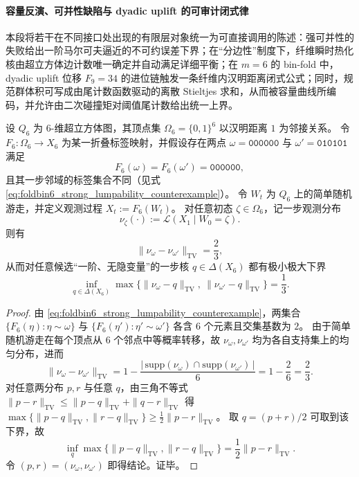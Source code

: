 \paragraph{容量反演、可并性缺陷与 dyadic uplift 的可审计闭式律}
本段将若干在不同接口处出现的有限层对象统一为可直接调用的陈述：强可并性的失败给出一阶马尔可夫逼近的不可约误差下界；在“分边性”制度下，纤维瞬时热化核由超立方体边计数唯一确定并自动满足详细平衡；在 \(m=6\) 的 bin-fold 中，dyadic uplift 位移 \(F_9=34\) 的进位链触发一条纤维内汉明距离闭式公式；同时，规范群体积可写成由尾计数函数驱动的离散 Stieltjes 求和，从而被容量曲线所编码，并允许由二次碰撞矩对阈值尾计数给出统一上界。

\begin{theorem}[强可并性缺陷的定量下界：\(m=6\) 的最优一阶马尔可夫逼近误差]\label{thm:foldbin6-strong-lumpability-minimax-markov-error}
设 \(Q_6\) 为 \(6\)-维超立方体图，其顶点集 \(\Omega_6=\{0,1\}^6\) 以汉明距离 \(1\) 为邻接关系。
令 \(F_6:\Omega_6\to X_6\) 为某一折叠标签映射，并假设存在两点
\(
\omega=\texttt{000000}
\)
与
\(
\omega'=\texttt{010101}
\)
满足
\[
F_6(\omega)=F_6(\omega')=\texttt{000000},
\]
且其一步邻域的标签集合不同（见式 \eqref{eq:foldbin6_strong_lumpability_counterexample}）。
令 \(W_t\) 为 \(Q_6\) 上的简单随机游走，并定义观测过程 \(X_t:=F_6(W_t)\)。
对任意初态 \(\zeta\in\Omega_6\)，记一步观测分布
\[
\nu_\zeta(\cdot):=\mathcal L(X_1\mid W_0=\zeta).
\]
则有
\[
\|\nu_\omega-\nu_{\omega'}\|_{\mathrm{TV}}=\frac{2}{3},
\]
从而对任意候选“一阶、无隐变量”的一步核 \(q\in\Delta(X_6)\) 都有极小极大下界
\[
\inf_{q\in\Delta(X_6)}\max\bigl\{\|\nu_\omega-q\|_{\mathrm{TV}},\ \|\nu_{\omega'}-q\|_{\mathrm{TV}}\bigr\}
=\frac{1}{3}.
\]
\end{theorem}

\begin{proof}
由 \eqref{eq:foldbin6_strong_lumpability_counterexample}，两集合
\(
\{F_6(\eta):\eta\sim\omega\}
\)
与
\(
\{F_6(\eta'):\eta'\sim\omega'\}
\)
各含 \(6\) 个元素且交集基数为 \(2\)。
由于简单随机游走在每个顶点从 \(6\) 个邻点中等概率转移，故 \(\nu_\omega,\nu_{\omega'}\) 均为各自支持集上的均匀分布，进而
\[
\|\nu_\omega-\nu_{\omega'}\|_{\mathrm{TV}}
=1-\frac{|\,\mathrm{supp}(\nu_\omega)\cap \mathrm{supp}(\nu_{\omega'})\,|}{6}
=1-\frac{2}{6}
=\frac{2}{3}.
\]
对任意两分布 \(p,r\) 与任意 \(q\)，由三角不等式
\(
\|p-r\|_{\mathrm{TV}}\le \|p-q\|_{\mathrm{TV}}+\|q-r\|_{\mathrm{TV}}
\)
得
\(
\max\{\|p-q\|_{\mathrm{TV}},\|r-q\|_{\mathrm{TV}}\}\ge \frac12\|p-r\|_{\mathrm{TV}}
\)。
取 \(q=(p+r)/2\) 可取到该下界，故
\[
\inf_q\max\{\|p-q\|_{\mathrm{TV}},\|r-q\|_{\mathrm{TV}}\}
=\frac12\|p-r\|_{\mathrm{TV}}.
\]
令 \((p,r)=(\nu_\omega,\nu_{\omega'})\) 即得结论。证毕。
\end{proof}


